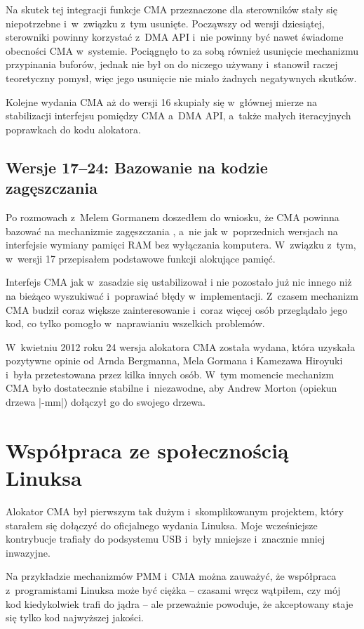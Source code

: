 Na skutek tej integracji funkcje CMA przeznaczone dla sterowników
stały się niepotrzebne i~w~związku z~tym usunięte.  Począwszy od
wersji dziesiątej, sterowniki powinny korzystać z~DMA API i~nie
powinny być nawet świadome obecności CMA w~systemie.  Pociągnęło to za
sobą również usunięcie mechanizmu przypinania buforów, jednak nie był
on do niczego używany i~stanowił raczej teoretyczny pomysł, więc jego
usunięcie nie miało żadnych negatywnych skutków.

Kolejne wydania CMA aż do wersji 16 skupiały się w~głównej mierze na
stabilizacji interfejsu pomiędzy CMA a~DMA API, a~także małych
iteracyjnych poprawkach do kodu alokatora.

\subsection{Wersje 17--24: Bazowanie na kodzie zagęszczania}

Po rozmowach z~Melem Gormanem doszedłem do wniosku, że CMA powinna
bazować na mechanizmie zagęszczania \autocite{bib:compaction,
  bib:supporting-large-contig-regions}, a~nie jak w~poprzednich
wersjach na interfejsie wymiany pamięci RAM bez wyłączania komputera.
W~związku z~tym, w~wersji 17 przepisałem podstawowe funkcji alokujące
pamięć.

Interfejs CMA jak w~zasadzie się ustabilizował i nie pozostało już nic
innego niż na bieżąco wyszukiwać i~poprawiać błędy w~implementacji.
Z~czasem mechanizm CMA budził coraz większe zainteresowanie i~coraz
więcej osób przeglądało jego kod, co tylko pomogło w~naprawianiu
wszelkich problemów.

W~kwietniu 2012 roku 24 wersja alokatora CMA została wydana, która
uzyskała pozytywne opinie od Arnda Bergmanna, Mela Gormana i Kamezawa
Hiroyuki i~była przetestowana przez kilka innych osób.  W~tym momencie
mechanizm CMA było dostatecznie stabilne i~niezawodne, aby Andrew
Morton (opiekun drzewa \code|-mm|) dołączył go do swojego drzewa.

\section{Współpraca ze społecznością Linuksa}

Alokator CMA był pierwszym tak dużym i~skomplikowanym projektem, który
starałem się dołączyć do oficjalnego wydania Linuksa.  Moje
wcześniejsze kontrybucje trafiały do podsystemu USB i~były mniejsze
i~znacznie mniej inwazyjne.

Na przykładzie mechanizmów PMM i~CMA można zauważyć, że współpraca
z~programistami Linuksa może być ciężka -- czasami wręcz wątpiłem, czy
mój kod kiedykolwiek trafi do jądra -- ale przeważnie powoduje, że
akceptowany staje się tylko kod najwyższej jakości.


